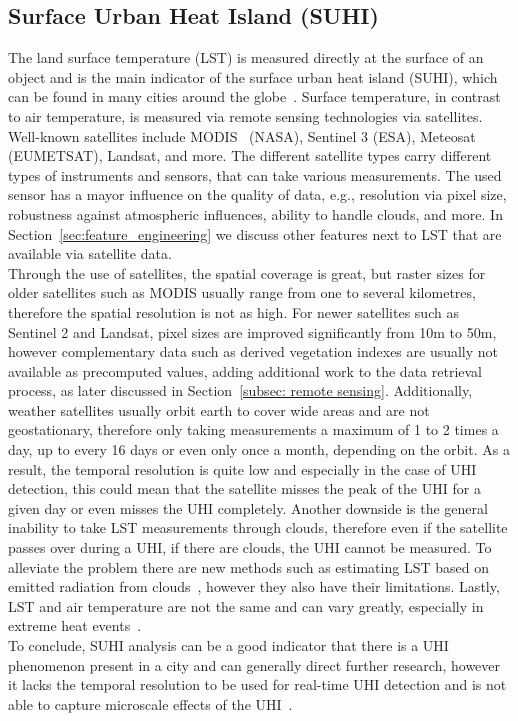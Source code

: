 \subsection{Surface Urban Heat Island (SUHI)}

The land surface temperature (LST) is measured directly at the surface of an object and is the main indicator of the surface urban heat island (SUHI), which can be found in many cities around the globe~\cite{peng2012surface}. Surface temperature, in contrast to air temperature, is measured via remote sensing technologies via satellites. Well-known satellites include MODIS~\cite{didan2021modis} (NASA), Sentinel 3 (ESA), Meteosat (EUMETSAT), Landsat, and more. The different satellite types carry different types of instruments and sensors, that can take various measurements. The used sensor has a mayor influence on the quality of data, e.g., resolution via pixel size, robustness against atmospheric influences, ability to handle clouds, and more. In Section~\ref{sec:feature_engineering} we discuss other features next to LST that are available via satellite data.\\
Through the use of satellites, the spatial coverage is great, but raster sizes for older satellites such as MODIS usually range from one to several kilometres, therefore the spatial resolution is not as high. For newer satellites such as Sentinel 2 and Landsat, pixel sizes are improved significantly from 10m to 50m, however complementary data such as derived vegetation indexes are usually not available as precomputed values, adding additional work to the data retrieval process, as later discussed in Section~\ref{subsec: remote sensing}.
Additionally, weather satellites usually orbit earth to cover wide areas and are not geostationary, therefore only taking measurements a maximum of 1 to 2 times a day, up to every 16 days or even only once a month, depending on the orbit. As a result, the temporal resolution is quite low and especially in the case of UHI detection, this could mean that the satellite misses the peak of the UHI for a given day or even misses the UHI completely. Another downside is the general inability to take LST measurements through clouds, therefore even if the satellite passes over during a UHI, if there are clouds, the UHI cannot be measured. To alleviate the problem there are new methods such as estimating LST based on emitted radiation from clouds~\cite{zhang2015estimation}, however they also have their limitations. Lastly, LST and air temperature are not the same and can vary greatly, especially in extreme heat events~\cite{good2016situ}.\\
To conclude, SUHI analysis can be a good indicator that there is a UHI phenomenon present in a city and can generally direct further research, however it lacks the temporal resolution to be used for real-time UHI detection and is not able to capture microscale effects of the UHI~\cite{voogt2003thermal, voelkel2017towards}.

